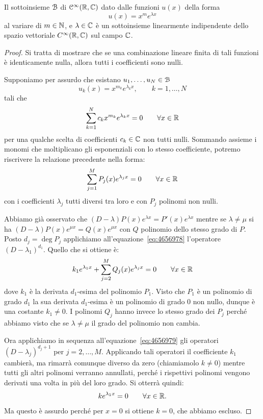 \begin{theorem}
\mymark{***}
Il sottoinsieme $\mathcal B$ di $\mathcal C^\infty(\mathbb R, \mathbb C)$ dato dalle funzioni $u(x)$ della forma
\[
   u(x) = x^m e^{\lambda x}
\]
al variare di $m\in \mathbb N$, e $\lambda \in \mathbb C$ è un sottoinsieme linearmente indipendente
dello spazio vettoriale $C^\infty(\mathbb R,\mathbb C)$ sul campo $\mathbb C$.
\end{theorem}
%
\begin{proof}
Si tratta di mostrare che se una combinazione lineare finita di tali funzioni
è identicamente nulla, allora tutti i coefficienti sono nulli.

Supponiamo per assurdo che esistano
$u_1, \dots, u_N\in \mathcal B$
\[
  u_k(x) = x^{m_k} e^{\lambda_k x}, \qquad k=1, \dots, N
\]
tali che
\[
\sum_{k=1}^N c_k x^{m_k} e^{\lambda_k x} = 0
  \qquad \forall x \in \mathbb R
\]
per una qualche scelta di coefficienti $c_k \in \mathbb C$ non tutti nulli.
Sommando assieme i monomi che moltiplicano gli esponenziali con lo stesso
coefficiente, potremo riscrivere la relazione precedente nella forma:
\begin{equation}\label{eq:4656978}
  \sum_{j=1}^M P_j(x) e^{\lambda_j x} = 0 \qquad \forall x\in \mathbb R
\end{equation}
con i coefficienti $\lambda_j$ tutti diversi tra loro e con
$P_j$ polinomi non nulli.

Abbiamo già osservato che $(D-\lambda)P(x)e^{\lambda x}= P'(x)e^{\lambda x}$
mentre se $\lambda\neq \mu$ si ha $(D-\lambda)P(x) e^{\mu x}= Q(x) e^{\mu x}$
con $Q$ polinomio dello stesso grado di $P$.
Posto $d_j = \deg P_j$ applichiamo all'equazione~\eqref{eq:4656978}
l'operatore $(D-\lambda_1)^{d_1}$.
Quello che si ottiene è:
\begin{equation}\label{eq:4656979}
  k_1 e^{\lambda_1 x} + \sum_{j=2}^M Q_j(x) e^{\lambda_j x} = 0 \qquad \forall x\in \mathbb R
\end{equation}
dove $k_1$ è la derivata $d_1$-esima del polinomio $P_1$.
Visto che $P_1$ è un polinomio di grado $d_1$ la sua derivata
$d_1$-esima è un polinomio di grado $0$ non nullo,
dunque è una costante $k_1 \neq 0$.
I polinomi $Q_j$ hanno invece lo stesso grado dei $P_j$ perché abbiamo visto
che se $\lambda\neq \mu$ il grado del polinomio non cambia.

Ora applichiamo in sequenza all'equazione~\eqref{eq:4656979} gli operatori
$(D-\lambda_j)^{d_j+1}$ per $j=2,\dots, M$.
Applicando tali operatori il coefficiente $k_1$ cambierà, ma rimarrà comunque
diverso da zero (chiamiamolo $k\neq 0$) mentre tutti gli altri polinomi
verranno annullati, perché i rispettivi polinomi vengono derivati una volta in
più del loro grado. Si otterrà quindi:
\[
  k e^{\lambda_1 x} = 0 \qquad \forall x\in \mathbb R.
\]
Ma questo è assurdo perché per $x=0$ si ottiene $k=0$, che abbiamo escluso.
\end{proof}

